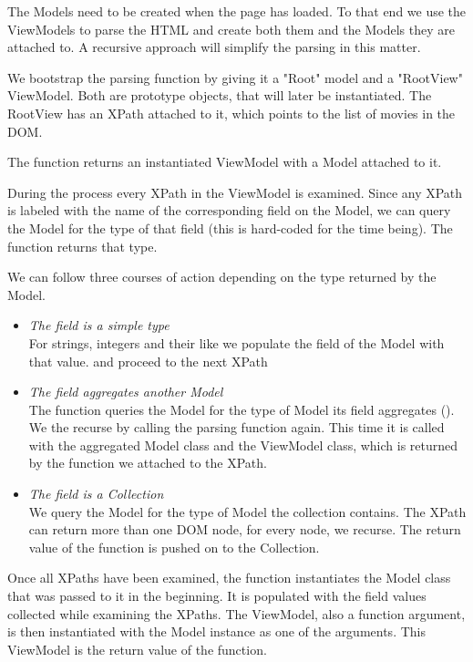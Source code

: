 The Models need to be created when the page has loaded. To that end we use the
ViewModels to parse the HTML and create both them and the Models they are
attached to.
A recursive approach will simplify the parsing in this matter.

We bootstrap the parsing function by giving it a "Root" model and a "RootView"
ViewModel. Both are prototype objects, that will later be instantiated.
The RootView has an XPath attached to it, which points to the list of movies
in the DOM.

The function returns an instantiated ViewModel with a Model attached to it.

During the process every XPath in the ViewModel is examined.
Since any XPath is labeled with the name of the corresponding field on the
Model, we can query the Model for the type of that field
(this is hard-coded for the time being). The function 
returns that type.

We can follow three courses of action depending on the type
returned by the Model.
\begin{itemize}
	\item \emph{The field is a simple type}\\
	For strings, integers and their like we populate the field of the Model
	with that value. and proceed to the next XPath
	\item \emph{The field aggregates another Model}\\
	The function queries the Model for the type of Model its field aggregates
	().
	We the recurse by calling the parsing function again.
	This time it is called with the aggregated Model class and
	the ViewModel class, which is returned by the  function
	we attached to the XPath.
	\item \emph{The field is a Collection}\\
	We query the Model for the type of Model the collection contains.
	The XPath can return more than one DOM node, for every node, we recurse.
	The return value of the function is pushed on to the Collection.
\end{itemize}

Once all XPaths have been examined, the function instantiates the Model class
that was passed to it in the beginning. It is populated with the field values
collected while examining the XPaths.
The ViewModel, also a function argument, is then instantiated with
the Model instance as one of the arguments.
This ViewModel is the return value of the function.

